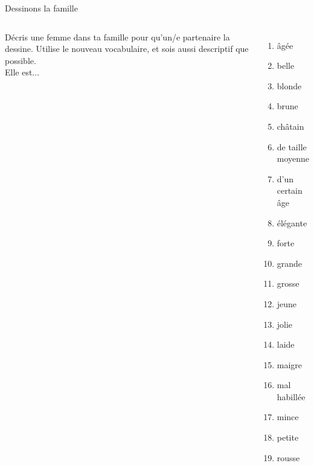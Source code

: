 \documentclass{beamer}
\begin{document}
  \begin{frame}{Dessinons la famille}
    \begin{columns}
        Décris une femme dans ta famille pour qu'un/e partenaire la dessine.
        Utilise le nouveau vocabulaire, et sois aussi descriptif que possible. \\
        \tiny
        Elle est...
        \begin{enumerate}
          \item âgée
          \item belle
          \item blonde
          \item brune
          \item châtain
          \item de taille moyenne
          \item d'un certain âge
          \item élégante
          \item forte
          \item grande
          \item grosse
          \item jeune
          \item jolie
          \item laide
          \item maigre
          \item mal habillée
          \item mince
          \item petite
          \item rousse
        \end{enumerate}
        \tiny
          

\end{columns}
\end{frame}
\end{document}
